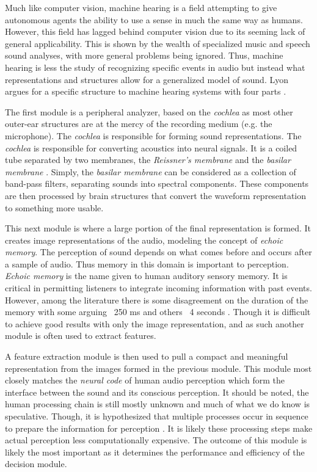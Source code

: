 Much like computer vision, machine hearing is a field attempting to give autonomous agents the ability to use a sense in much the same way as humans. However, this field has lagged behind computer vision due to its seeming lack of general applicability. This is shown by the wealth of specialized music and speech sound analyses, with more general problems being ignored. Thus, machine hearing is less the study of recognizing specific events in audio but instead what representations and structures allow for a generalized model of sound. Lyon argues for a specific structure to machine hearing systems with four parts \cite{lyon_machine_2010}.

The first module is a peripheral analyzer, based on the \textit{cochlea} as most other outer-ear structures are at the mercy of the recording medium (e.g. the microphone). The \textit{cochlea} is responsible for forming sound representations. The \textit{cochlea} is responsible for converting acoustics into neural signals. It is a coiled tube separated by two membranes, the \textit{Reissner's membrane} and the \textit{basilar membrane} \cite{Plack2018}. Simply, the \textit{basilar membrane} can be considered as a collection of band-pass filters, separating sounds into spectral components. These components are then processed by brain structures that convert the waveform representation to something more usable.

This next module is where a large portion of the final representation is formed. It creates image representations of the audio, modeling the concept of \textit{echoic memory}. The perception of sound depends on what comes before and occurs after a sample of audio. Thus memory in this domain is important to perception. \textit{Echoic memory} is the name given to human auditory sensory memory. It is critical in permitting listeners to integrate incoming information with past events. However, among the literature there is some disagreement on the duration of the memory with some arguing ~250 ms and others ~4 seconds \cite{Wingfield2016}. Though it is difficult to achieve good results with only the image representation, and as such another module is often used to extract features.

A feature extraction module is then used to pull a compact and meaningful representation from the images formed in the previous module. This module most closely matches the \textit{neural code} of human audio perception which form the interface between the sound and its conscious perception. It should be noted, the human processing chain is still mostly unknown and much of what we do know is speculative. Though, it is hypothesized that multiple processes occur in sequence to prepare the information for perception \cite{Eggermont2001}. It is likely these processing steps make actual perception less computationally expensive. The outcome of this module is likely the most important as it determines the performance and efficiency of the decision module.


